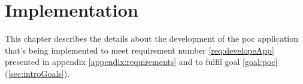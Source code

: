 \chapter{Implementation}\label{impl}
This chapter describes the details about the development of the \acrfull{poc} application that's being implemented to meet requirement number \ref{req:developeApp} presented in appendix \ref{appendix:requirements} and to fulfil goal \ref{goal:poc} (\cref{sec:introGoals}).





